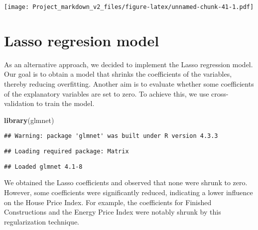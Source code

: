 \documentclass[
]{article}
\newenvironment{Shaded}{\begin{snugshade}}{\end{snugshade}}
\newcommand{\AttributeTok}[1]{\textcolor[rgb]{0.13,0.29,0.53}{#1}}
\newcommand{\CommentTok}[1]{\textcolor[rgb]{0.56,0.35,0.01}{\textit{#1}}}
\newcommand{\DecValTok}[1]{\textcolor[rgb]{0.00,0.00,0.81}{#1}}
\newcommand{\FunctionTok}[1]{\textcolor[rgb]{0.13,0.29,0.53}{\textbf{#1}}}
\newcommand{\NormalTok}[1]{#1}
\newcommand{\OtherTok}[1]{\textcolor[rgb]{0.56,0.35,0.01}{#1}}
\newcommand{\SpecialCharTok}[1]{\textcolor[rgb]{0.81,0.36,0.00}{\textbf{#1}}}
\begin{document}
\texttt{[image: Project\_markdown\_v2\_files/figure-latex/unnamed-chunk-41-1.pdf]}

\section{Lasso regresion model}\label{lasso-regresion-model}

As an alternative approach, we decided to implement the Lasso regression
model. Our goal is to obtain a model that shrinks the coefficients of
the variables, thereby reducing overfitting. Another aim is to evaluate
whether some coefficients of the explanatory variables are set to zero.
To achieve this, we use cross-validation to train the model.

\begin{Shaded}
\begin{Highlighting}[]
\FunctionTok{library}\NormalTok{(glmnet)}
\end{Highlighting}
\end{Shaded}

\begin{verbatim}
## Warning: package 'glmnet' was built under R version 4.3.3
\end{verbatim}

\begin{verbatim}
## Loading required package: Matrix
\end{verbatim}

\begin{verbatim}
## Loaded glmnet 4.1-8
\end{verbatim}

\begin{Shaded}
\end{Shaded}

We obtained the Lasso coefficients and observed that none were shrunk to
zero. However, some coefficients were significantly reduced, indicating
a lower influence on the House Price Index. For example, the
coefficients for Finished Constructions and the Energy Price Index were
notably shrunk by this regularization technique.
\end{document}
